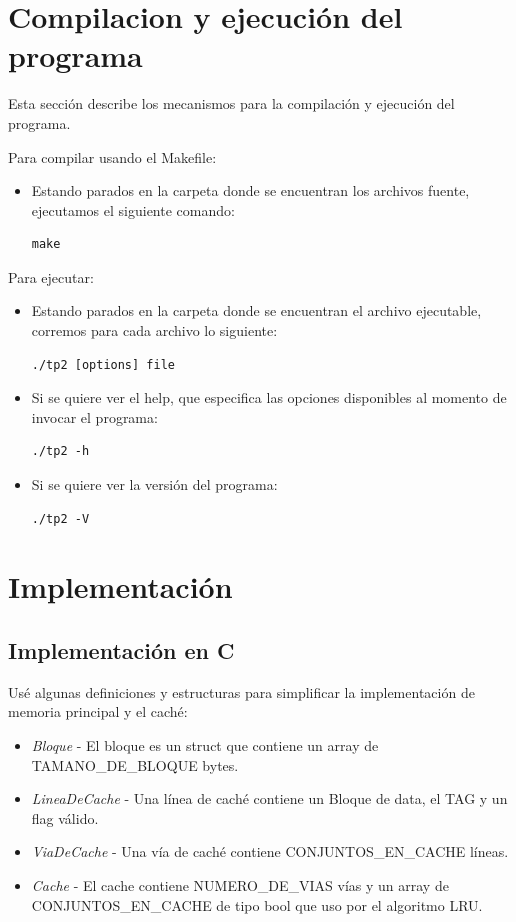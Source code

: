 \documentclass[a4paper]{article}
\begin{document}
\section{Compilacion y ejecución del programa}
Esta sección describe  los mecanismos para la compilación y ejecución del programa.

Para compilar usando el Makefile:
\begin{itemize}
\item Estando parados en la carpeta donde se encuentran los archivos fuente, ejecutamos el siguiente comando:
\begin{verbatim}
make
\end{verbatim}
\end{itemize}

Para ejecutar:
\begin{itemize}
\item Estando parados en la carpeta donde se encuentran el archivo ejecutable, corremos para cada archivo lo siguiente:
\begin{verbatim}
./tp2 [options] file 
\end{verbatim}
\item Si se quiere ver el help, que especifica las opciones disponibles al momento de invocar el programa:
\begin{verbatim}
./tp2 -h
\end{verbatim}
\item Si se quiere ver la versión del programa:
\begin{verbatim}
./tp2 -V
\end{verbatim}
\end{itemize}

\section{Implementación}
\subsection{Implementación en C}

Usé algunas definiciones y estructuras para simplificar la implementación de memoria principal y el caché:

\begin{itemize}
\item \textit{Bloque} - El bloque es un struct que contiene un array de TAMANO\_DE\_BLOQUE bytes.
\item \textit{LineaDeCache} - Una línea de caché contiene un Bloque de data, el TAG y un flag válido.
\item \textit{ViaDeCache} - Una vía de caché contiene CONJUNTOS\_EN\_CACHE líneas.
\item \textit{Cache} - El cache contiene NUMERO\_DE\_VIAS vías y un array de CONJUNTOS\_EN\_CACHE de tipo bool que uso por el algoritmo LRU.
\end{itemize}
\end{document}
